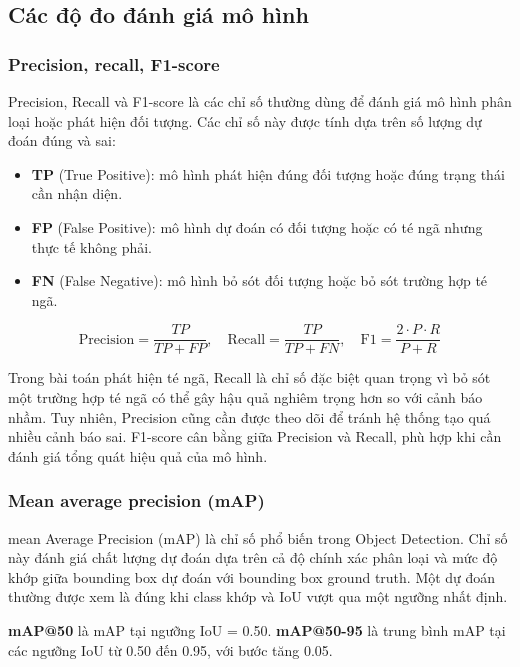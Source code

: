 \documentclass[12pt, a4paper]{article}
\begin{document}
\subsection{Các độ đo đánh giá mô hình}

\subsubsection{Precision, recall, F1-score}
Precision, Recall và F1-score là các chỉ số thường dùng để đánh giá mô hình phân loại hoặc phát hiện đối tượng.
Các chỉ số này được tính dựa trên số lượng dự đoán đúng và sai:

\begin{itemize}[nosep]
  \item \textbf{TP} (True Positive): mô hình phát hiện đúng đối tượng hoặc đúng trạng thái cần nhận diện.
  \item \textbf{FP} (False Positive): mô hình dự đoán có đối tượng hoặc có té ngã nhưng thực tế không phải.
  \item \textbf{FN} (False Negative): mô hình bỏ sót đối tượng hoặc bỏ sót trường hợp té ngã.
\end{itemize}

\begin{equation}
  \text{Precision} = \frac{TP}{TP + FP}, \quad
  \text{Recall} = \frac{TP}{TP + FN}, \quad
  \text{F1} = \frac{2 \cdot P \cdot R}{P + R}
\end{equation}

Trong bài toán phát hiện té ngã, Recall là chỉ số đặc biệt quan trọng vì bỏ sót một trường hợp té ngã có thể gây hậu quả nghiêm trọng hơn so với cảnh báo nhầm.
Tuy nhiên, Precision cũng cần được theo dõi để tránh hệ thống tạo quá nhiều cảnh báo sai.
F1-score cân bằng giữa Precision và Recall, phù hợp khi cần đánh giá tổng quát hiệu quả của mô hình.

\subsubsection{Mean average precision (mAP)}
mean Average Precision (mAP) là chỉ số phổ biến trong Object Detection.
Chỉ số này đánh giá chất lượng dự đoán dựa trên cả độ chính xác phân loại và mức độ khớp giữa bounding box dự đoán với bounding box ground truth.
Một dự đoán thường được xem là đúng khi class khớp và IoU vượt qua một ngưỡng nhất định.

\textbf{mAP@50} là mAP tại ngưỡng IoU = 0.50.
\textbf{mAP@50-95} là trung bình mAP tại các ngưỡng IoU từ 0.50 đến 0.95, với bước tăng 0.05.
\end{document}
